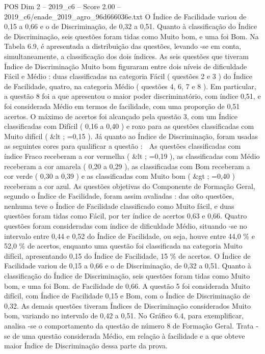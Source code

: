 \begin{textsample}{POS Dim 2 – 2019\_c6 – Score 2.00 – 2019\_c6/enade\_2019\_agro\_96d666036e.txt}
O Índice de Facilidade variou de 0,15 a 0,66 e o de Discriminação, de 0,32 a 0,51.
Quanto à classificação do Índice de Discriminação, seis questões foram tidas como Muito bom, e uma foi Bom.
Na Tabela 6.9, é apresentada a distribuição das questões, levando -se em conta, simultaneamente, a classificação dos dois índices.
As seis questões que tiveram Índice de Discriminação Muito bom figuraram entre dois níveis de dificuldade Fácil e Médio : duas classificadas na categoria Fácil ( questões 2 e 3 ) do Índice de Facilidade, quatro, na categoria Médio ( questões 4, 6, 7 e 8 ).
Em particular, a questão 8 foi a que apresentou o maior poder discriminatório, com índice 0,51, e foi considerada Médio em termos de facilidade, com uma proporção de 0,51 acertos.
O máximo de acertos foi alcançado pela questão 3, com um Índice classificadas com Difícil ( 0,16 a 0,40 ) e roxo para as questões classificadas com Muito difícil ( \&lt ; =0,15 ).
Já quanto ao Índice de Discriminação, foram usadas as seguintes cores para qualificar a questão :  As questões classificadas com índice Fraco receberam a cor vermelha ( \&lt ; =0,19 ), as classificadas com Médio receberam a cor amarela ( 0,20 a 0,29 ), as classificadas com Bom receberam a cor verde ( 0,30 a 0,39 ) e as classificadas com Muito bom ( \&gt ; =0,40 ) receberam a cor azul.
As questões objetivas do Componente de Formação Geral, segundo o Índice de Facilidade, foram assim avaliadas : das oito questões, nenhuma teve o Índice de Facilidade classificado como Muito fácil, e duas questões foram tidas como Fácil, por ter índice de acertos 0,63 e 0,66.
Quatro questões foram consideradas com índice de dificuldade Médio, situando -se no intervalo entre 0,44 e 0,52 do Índice de Facilidade, ou seja, houve entre 44,0 \% e 52,0 \% de acertos, enquanto uma questão foi classificada na categoria Muito difícil, apresentando 0,15 do Índice de Facilidade, 15 \% de acertos.
O Índice de Facilidade variou de 0,15 a 0,66 e o de Discriminação, de 0,32 a 0,51.
Quanto à classificação do Índice de Discriminação, seis questões foram tidas como Muito bom, e uma foi Bom. de Facilidade de 0,66.
A questão 5 foi considerada Muito difícil, com Índice de Facilidade 0,15 e Bom, com o Índice de Discriminação de 0,32.
As demais questões tiveram Índices de Discriminação considerados Muito bom, variando no intervalo de 0,42 a 0,51.
No Gráfico 6.4, para exemplificar, analisa -se o comportamento da questão de número 8 de Formação Geral.
Trata -se de uma questão considerada Médio, em relação à facilidade e a que obteve maior Índice de Discriminação dessa parte da prova.

\end{textsample}

